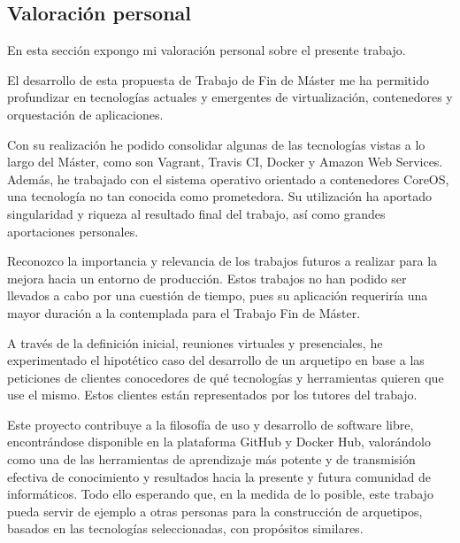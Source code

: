 \subsection{Valoración personal}

En esta sección expongo mi valoración personal sobre el presente trabajo.

El desarrollo de esta propuesta de Trabajo de Fin de Máster me ha permitido profundizar en tecnologías actuales y emergentes de virtualización, contenedores y orquestación de aplicaciones.

Con su realización he podido consolidar algunas de las tecnologías vistas a lo largo del Máster, como son Vagrant, Travis CI, Docker y Amazon Web Services. Además, he trabajado con el sistema operativo orientado a contenedores CoreOS, una tecnología no tan conocida como prometedora. Su utilización ha aportado singularidad y riqueza al resultado final del trabajo, así como grandes aportaciones personales.

Reconozco la importancia y relevancia de los trabajos futuros a realizar para la mejora hacia un entorno de producción. Estos trabajos no han podido ser llevados a cabo por una cuestión de tiempo, pues su aplicación requeriría una mayor duración a la contemplada para el Trabajo Fin de Máster.

A través de la definición inicial, reuniones virtuales y presenciales, he experimentado el hipotético caso del desarrollo de un arquetipo en base a las peticiones de clientes conocedores de qué tecnologías y herramientas quieren que use el mismo. Estos clientes están representados por los tutores del trabajo. 

Este proyecto contribuye a la filosofía de uso y desarrollo de software libre, encontrándose disponible en la plataforma GitHub y Docker Hub, valorándolo como una de las herramientas de aprendizaje más potente y de transmisión efectiva de conocimiento y resultados hacia la presente y futura comunidad de informáticos. Todo ello esperando que, en la medida de lo posible, este trabajo pueda servir de ejemplo a otras personas para la construcción de arquetipos, basados en las tecnologías seleccionadas, con propósitos similares.

